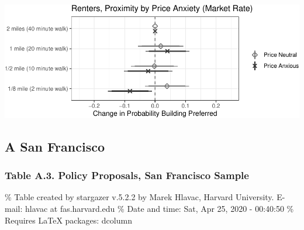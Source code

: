 \documentclass[]{article}
\begin{document}
\includegraphics{Zheng-Ruth-Renters-Paper_files/figure-latex/Figure 7 print-1.pdf}

\hypertarget{a-san-francisco}{%
\subsection{A San Francisco}\label{a-san-francisco}}

\hypertarget{table-a.3.-policy-proposals-san-francisco-sample}{%
\subsubsection{Table A.3. Policy Proposals, San Francisco Sample}\label{table-a.3.-policy-proposals-san-francisco-sample}}

\% Table created by stargazer v.5.2.2 by Marek Hlavac, Harvard University. E-mail: hlavac at fas.harvard.edu
\% Date and time: Sat, Apr 25, 2020 - 00:40:50
\% Requires LaTeX packages: dcolumn
\end{document}
